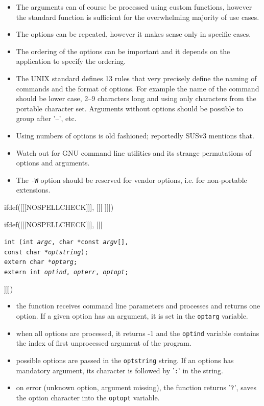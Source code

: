 \begin{itemize}
\item The arguments can of course be processed using custom functions, however
the standard function is sufficient for the overwhelming majority of use cases.
\item The options can be repeated, however it makes sense only in specific
cases.
\item The ordering of the options can be important and it depends on the
application to specify the ordering.
\item The UNIX standard defines 13 rules that very precisely define the naming
of commands and the format of options. For example the name of the command
should be lower case, 2--9 characters long and using only characters from
the portable character set. Arguments without options should be possible to group
after '--', etc.
\item Using numbers of options is old fashioned; reportedly SUSv3 mentions that.
\item Watch out for GNU command line utilities and its strange permutations
of options and arguments.
\item The \texttt{-W} option should be reserved for vendor options, i.e. for
non-portable extensions.
\end{itemize}


ifdef([[[NOSPELLCHECK]]], [[[
]]])

\begin{slide}
\setlength{\baselineskip}{0.8\baselineskip}
ifdef([[[NOSPELLCHECK]]], [[[
\begin{tabbing}
\texttt{int (}\=\texttt{int \emph{argc},
char *const \emph{argv}[],}\\
\>\texttt{const char *\emph{optstring});}\\
\texttt{extern char *\emph{optarg};}\\
\texttt{extern int \emph{optind}, \emph{opterr}, \emph{optopt};} 
\end{tabbing}
]]])
\begin{itemize}
\item the function receives command line parameters and processes and returns
one option. If a given option has an argument, it is set in the
\texttt{optarg} variable.
\item when all options are processed, it returns -1 and the \texttt{optind} 
variable contains the index of first unprocessed argument of the program.
\item possible options are passed in the \texttt{optstring} string.
If an options has mandatory argument, its character is followed by '\texttt{:}'
in the string.
\item on error (unknown option, argument missing), the function returns
'\texttt{?}', saves the option character into the \texttt{optopt} variable.
\end{itemize}
\end{slide}

